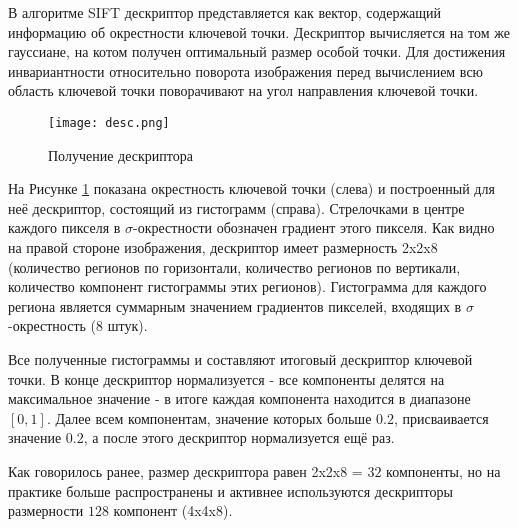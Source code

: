 В алгоритме SIFT дескриптор представляется как вектор, содержащий информацию об окрестности ключевой точки. Дескриптор вычисляется на том же гауссиане, на котом получен оптимальный размер особой точки. Для достижения инвариантности относительно поворота изображения перед вычислением всю область ключевой точки поворачивают на угол направления ключевой точки.

\begin{figure}[h]
    \centering
    \texttt{[image: desc.png]}
    \caption{Получение дескриптора}
    \label{fig:desc}
\end{figure}

На Рисунке \ref{fig:desc} показана окрестность ключевой точки (слева) и построенный для неё дескриптор, состоящий из гистограмм (справа). Стрелочками в центре каждого пикселя в $\sigma$-окрестности обозначен градиент этого пикселя. Как видно на правой стороне изображения, дескриптор имеет размерность 2x2x8 (количество регионов по горизонтали, количество регионов по вертикали, количество компонент гистограммы этих регионов). Гистограмма для каждого региона является суммарным значением градиентов пикселей, входящих в $\sigma$-окрестность ($8$ штук).

Все полученные гистограммы и составляют итоговый дескриптор ключевой точки. В конце дескриптор нормализуется - все компоненты делятся на максимальное значение - в итоге каждая компонента находится в диапазоне $[0,1]$. Далее всем компонентам, значение которых больше $0.2$, присваивается значение $0.2$, а после этого дескриптор нормализуется ещё раз.

Как говорилось ранее, размер дескриптора равен 2x2x8 = $32$ компоненты, но на практике больше распространены и активнее используются дескрипторы размерности $128$ компонент (4x4x8).
